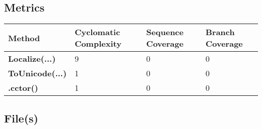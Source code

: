 \documentclass[a4paper,10pt]{article}
\begin{document}
\subsection{Metrics}
\begin{longtable}[l]{|l|l|l|l|}
\hline
\textbf{Method} & \textbf{Cyclomatic Complexity} & \textbf{Sequence Coverage} & \textbf{Branch Coverage}\\
\hline
\textbf{Localize(...)} & 9 & 0 & 0\\
\hline
\textbf{ToUnicode(...)} & 1 & 0 & 0\\
\hline
\textbf{.cctor()} & 1 & 0 & 0\\
\hline
\end{longtable}
\subsection{File(s)}
\end{document}
